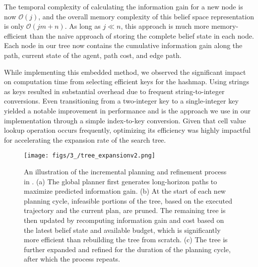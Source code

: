 
The temporal complexity of calculating the information gain for a new node is now $\mathcal{O}(j)$, and the overall memory complexity of this belief space representation is only $\mathcal{O}(jm + n)$. As long as $j \ll n$, this approach is much more memory-efficient than the naive approach of storing the complete belief state in each node. Each node in our tree now contains the cumulative information gain along the path, current state of the agent, path cost, and edge path.

While implementing this embedded method, we observed the significant impact on computation time from selecting efficient keys for the hashmap. Using strings as keys resulted in substantial overhead due to frequent string-to-integer conversions. Even transitioning from a two-integer key to a single-integer key yielded a notable improvement in performance and is the approach we use in our implementation through a simple index-to-key conversion. Given that cell value lookup operation occurs frequently, optimizing its efficiency was highly impactful for accelerating the expansion rate of the search tree.


\begin{figure*}[t]
\centering
\texttt{[image: figs/3\_/tree\_expansionv2.png]}
\caption{An illustration of the incremental planning and refinement process in \PlannerName. (a) The global planner first generates long-horizon paths to maximize predicted information gain. (b) At the start of each new planning cycle, infeasible portions of the tree, based on the executed trajectory and the current plan, are pruned. The remaining tree is then updated by recomputing information gain and cost based on the latest belief state and available budget, which is significantly more efficient than rebuilding the tree from scratch. (c) The tree is further expanded and refined for the duration of the planning cycle, after which the process repeats.
}
\label{fig:algorithm-breakdown}
\end{figure*}


